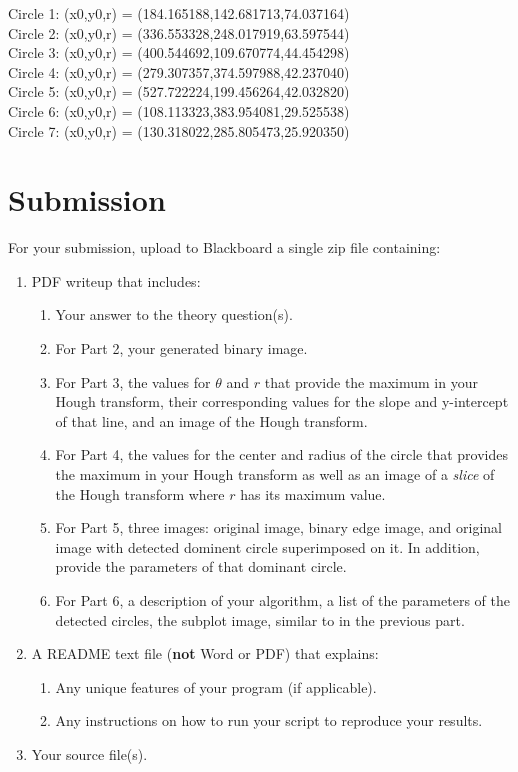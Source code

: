 \documentclass[12pt]{article}
\begin{document}
Circle 1: (x0,y0,r) = (184.165188,142.681713,74.037164)\\
Circle 2: (x0,y0,r) = (336.553328,248.017919,63.597544)\\
Circle 3: (x0,y0,r) = (400.544692,109.670774,44.454298)\\
Circle 4: (x0,y0,r) = (279.307357,374.597988,42.237040)\\
Circle 5: (x0,y0,r) = (527.722224,199.456264,42.032820)\\
Circle 6: (x0,y0,r) = (108.113323,383.954081,29.525538)\\
Circle 7: (x0,y0,r) = (130.318022,285.805473,25.920350)\\


\newpage
\section*{Submission}
For your submission, upload to Blackboard a single zip file containing:

\begin{enumerate}
\item PDF writeup that includes:
\begin{enumerate}
\item Your answer to the theory question(s).
\item For Part 2, your generated binary image.
\item For Part 3, the values for $\theta$ and $r$ that provide the maximum in your Hough transform, their corresponding values for the slope and y-intercept of that line, and an image of the Hough transform.
\item For Part 4, the values for the center and radius of the circle that provides the maximum in your Hough transform as well as an image of a \emph{slice} of the Hough transform where $r$ has its maximum value.
\item For Part 5, three images:  original image, binary edge image, and original image with detected dominent circle superimposed on it.  In addition, provide the parameters of that dominant circle.
\item For Part 6, a description of your algorithm, a list of the parameters of the detected circles, the subplot image, similar to in the previous part.
\end{enumerate}
\item A README text file (\textbf{not} Word or PDF) that explains:
\begin{enumerate}
\item Any unique features of your program (if applicable).
\item Any instructions on how to run your script to reproduce your results.
\end{enumerate}
\item Your source file(s).
\end{enumerate}
\end{document}
